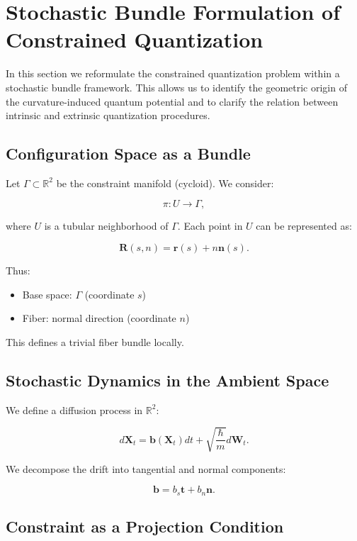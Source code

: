 \documentclass[11pt]{article}
\begin{document}
\section{Stochastic Bundle Formulation of Constrained Quantization}

In this section we reformulate the constrained quantization problem within a stochastic bundle framework. This allows us to identify the geometric origin of the curvature-induced quantum potential and to clarify the relation between intrinsic and extrinsic quantization procedures.

\subsection{Configuration Space as a Bundle}

Let $\Gamma \subset \mathbb{R}^2$ be the constraint manifold (cycloid). We consider:

\[
\pi : U \to \Gamma,
\]

where $U$ is a tubular neighborhood of $\Gamma$. Each point in $U$ can be represented as:

\[
\mathbf{R}(s,n) = \mathbf{r}(s) + n \mathbf{n}(s).
\]

Thus:

\begin{itemize}
\item Base space: $\Gamma$ (coordinate $s$)
\item Fiber: normal direction (coordinate $n$)
\end{itemize}

This defines a trivial fiber bundle locally.

\subsection{Stochastic Dynamics in the Ambient Space}

We define a diffusion process in $\mathbb{R}^2$:

\[
d\mathbf{X}_t = \mathbf{b}(\mathbf{X}_t) dt + \sqrt{\frac{\hbar}{m}} d\mathbf{W}_t.
\]

We decompose the drift into tangential and normal components:

\[
\mathbf{b} = b_s \mathbf{t} + b_n \mathbf{n}.
\]

\subsection{Constraint as a Projection Condition}
\end{document}
